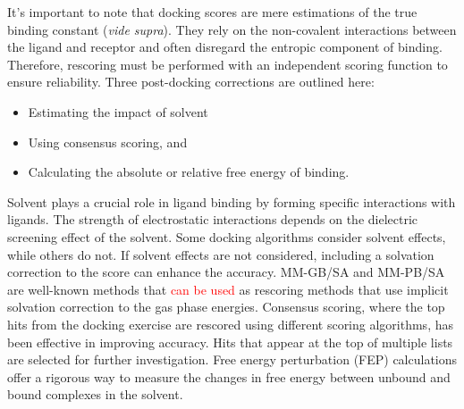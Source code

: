 {
}

%
It's important to note that docking scores are mere estimations of the true binding constant (\textit{vide supra}). They rely on the non-covalent interactions between the ligand and receptor and often disregard the entropic component of binding. Therefore, rescoring must be performed with an independent scoring function to ensure reliability.
    Three post-docking corrections are outlined here:
    \begin{itemize}
        \item Estimating the impact of solvent
        \item Using consensus scoring, and 
        \item Calculating the absolute or relative free energy of binding.
    \end{itemize}
Solvent plays a crucial role in ligand binding by forming specific interactions with ligands. The strength of electrostatic interactions depends on the dielectric screening effect of the solvent. Some docking algorithms consider solvent effects, while others do not. If solvent effects are not considered, including a solvation correction to the score can enhance the accuracy. MM-GB/SA and MM-PB/SA are well-known methods that \textcolor{red}{can be used} as rescoring methods that use implicit solvation correction to the gas phase energies\cite{bib13}. Consensus scoring, where the top hits from the docking exercise are rescored using different scoring algorithms, has been effective in improving accuracy. Hits that appear at the top of multiple lists are selected for further investigation. Free energy perturbation (FEP) calculations offer a rigorous way to measure the changes in free energy between unbound and bound complexes in the solvent.


